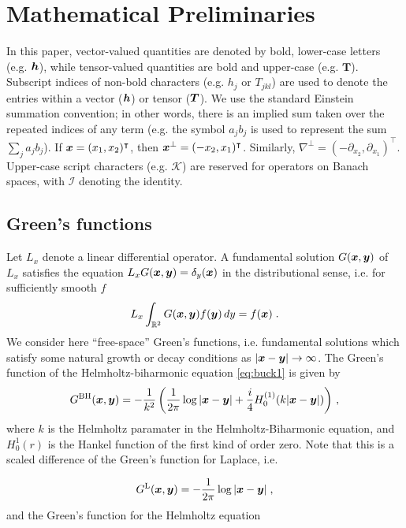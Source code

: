 \section{Mathematical Preliminaries}

In this paper, vector-valued
quantities are denoted by bold, lower-case letters
(e.g. ${\boldsymbol h}$), while tensor-valued quantities are bold
and upper-case (e.g. $\mathbf{T}$). 
Subscript indices of non-bold characters (e.g. $h_j$ or $T_{jkl}$)
are used to denote the entries within a vector (${\boldsymbol h}$) or tensor (${\boldsymbol T}$).
We use the standard Einstein summation convention; in other words, 
there is an implied sum taken over the repeated indices of 
any term (e.g. the symbol $a_{j} b_{j}$ is used to represent the sum
$\sum_{j} a_{j} b_{j}$).
If ${\boldsymbol x} = (x_1,x_2)^\intercal$, then ${\boldsymbol x}^\bot = (-x_2,x_1)^\intercal$.
Similarly, $\nabla^\bot = (-\partial_{x_2},\partial_{x_1})^\intercal$.
Upper-case script characters (e.g. $\mathcal{K}$) are reserved for
operators on Banach spaces, with $\mathcal{I}$ denoting the
identity.


\subsection{Green's functions}

Let $L_x$ denote a linear differential operator. A fundamental
solution $G({\boldsymbol x},{\boldsymbol y})$ of $L_x$ satisfies the equation
$L_x G({\boldsymbol x},{\boldsymbol y}) = \delta_y({\boldsymbol x})$ in the distributional sense, i.e.
for sufficiently smooth $f$
\begin{equation}
  L_x \int_{\mathbb{R}^2} G({\boldsymbol x},{\boldsymbol y}) f({\boldsymbol y}) \, dy = f({\boldsymbol x}) \; .
\end{equation}
We consider here
``free-space'' Green's functions, i.e. fundamental solutions which satisfy
some natural growth or decay conditions as $|{\boldsymbol x}-{\boldsymbol y}| \to \infty$.
The Green's function of the Helmholtz-biharmonic equation
\cref{eq:buck1} is given by 
\begin{equation}
  G^{\textrm{BH}}({\boldsymbol x},{\boldsymbol y}) = -\frac{1}{k^2}
  \left (\frac{1}{2\pi} \log |{\boldsymbol x}-{\boldsymbol y}| +
  \frac{i}{4} H_0^{(1)}(k|{\boldsymbol x}-{\boldsymbol y}|) \right ) \, , 
\end{equation}
where $k$ is the Helmholtz paramater in the Helmholtz-Biharmonic equation,
and $H_{0}^{1}(r)$ is the Hankel function of the first kind of order zero.
Note that this is a scaled difference of the Green's function for
Laplace, i.e.

\begin{equation}
  G^{\textrm{L}}({\boldsymbol x},{\boldsymbol y}) = -\frac{1}{2\pi} \log |{\boldsymbol x}-{\boldsymbol y}| \; ,
\end{equation}
and the Green's function for the Helmholtz equation

